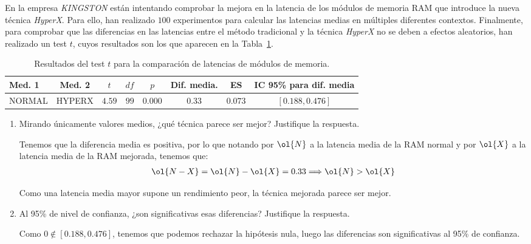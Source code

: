 \begin{ejercicio}\label{ej:4.16}
En la empresa \emph{KINGSTON} están intentando comprobar la mejora en la latencia de los módulos de memoria RAM que introduce la nueva técnica \emph{HyperX}. Para ello, han realizado $100$ experimentos para calcular las latencias medias en múltiples diferentes contextos. Finalmente, para comprobar que las diferencias en las latencias entre el método tradicional y la técnica \emph{HyperX} no se deben a efectos aleatorios, han realizado un test $t$, cuyos resultados son los que aparecen en la Tabla~\ref{tab:ej:4.16}.
\begin{table}[h]
\centering
\begin{tabular}{@{}lccccccc@{}}
\toprule
Med. 1 & Med. 2 & $t$ & $df$ & $p$ & Dif. media. & ES & IC 95\% para dif. media \\ \midrule
NORMAL & HYPERX & $4.59$ & $99$ & $0.000$ & $0.33$ & $0.073$ & $[0.188, 0.476]$ \\ \bottomrule
\end{tabular}
\caption{\centering Resultados del test $t$ para la comparación de latencias de módulos de memoria.}
\label{tab:ej:4.16}
\end{table}
\begin{enumerate}
    \item Mirando únicamente valores medios, ¿qué técnica parece ser mejor? Justifique la respuesta.
    
    Tenemos que la diferencia media  es positiva, por lo que notando por $\ol{N}$ a la latencia media de la RAM normal y por $\ol{X}$ a la latencia media de la RAM mejorada, tenemos que:
    \begin{align*}
        \ol{N-X} = \ol{N}-\ol{X}=0.33\Longrightarrow \ol{N}>\ol{X}
    \end{align*}

    Como una latencia media mayor supone un rendimiento peor, la técnica mejorada parece ser mejor.
    \item Al 95\% de nivel de confianza, ¿son significativas esas diferencias? Justifique la respuesta.
    
    Como $0\notin [0.188, 0.476]$, tenemos que podemos rechazar la hipótesis nula, luego las diferencias son significativas al 95\% de confianza. 
\end{enumerate}
    
\end{ejercicio}
\begin{comment}Sol:
a) La diferencia entre las latencias medias de ambas técnicas es $0.33$ ns, medida como latencia\_Normal - latencia\_HyperX. Por tanto, la latencia media usando el módulo de memoria Normal es $0.33$ ns mayor que la del módulo HyperX. Como una latencia mayor supone un rendimiento peor, la técnica mejor en este caso es la HyperX.
b) Las diferencias sí son significativas al 95\%. Podemos verlo fácilmente comprobando que el $0$ no está incluido en el intervalo de confianza del 95\% de las diferencias entre las latencias de ambas técnicas. También se puede comprobar viendo que el $p$-value (celda Sig. (2-tailed)), que mide la probabilidad de que ambas técnicas sean iguales es $0.000$, claramente inferior al valor umbral que marca el nivel de significatividad ($0.05$).
\end{comment}
